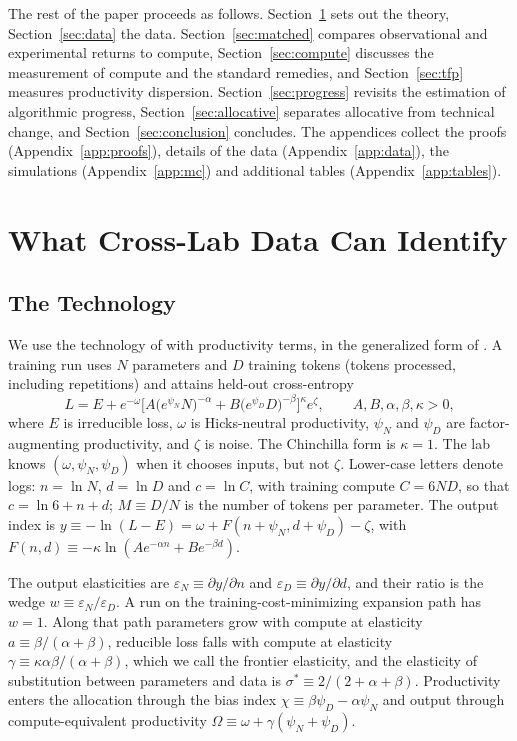 \documentclass[AER,finalmode]{AEA}
\theoremstyle{definition}
\theoremstyle{remark}
\begin{document}
The rest of the paper proceeds as follows. Section~\ref{sec:theory} sets out the theory, Section~\ref{sec:data} the
data. Section~\ref{sec:matched} compares observational and experimental returns to compute, Section~\ref{sec:compute}
discusses the measurement of compute and the standard remedies, and Section~\ref{sec:tfp} measures productivity
dispersion. Section~\ref{sec:progress} revisits the estimation of algorithmic progress, Section~\ref{sec:allocative}
separates allocative from technical change, and Section~\ref{sec:conclusion} concludes. The
appendices collect the proofs (Appendix~\ref{app:proofs}), details of the data (Appendix~\ref{app:data}), the
simulations (Appendix~\ref{app:mc}) and additional tables (Appendix~\ref{app:tables}).

\section{What Cross-Lab Data Can Identify}\label{sec:theory}

\subsection{The Technology}\label{sec:tech}

We use the technology of \citet{hoffmann2022training} with productivity terms, in the generalized form of
\citet{okar2026what}. A training run uses $N$ parameters and $D$ training tokens (tokens processed, including
repetitions) and attains held-out cross-entropy
\begin{equation}\label{eq:tech}
L=E+e^{-\omega}\Big[A\big(e^{\psi_N}N\big)^{-\alpha}+B\big(e^{\psi_D}D\big)^{-\beta}\Big]^{\kappa}e^{\zeta},
\qquad A,B,\alpha,\beta,\kappa>0,
\end{equation}
where $E$ is irreducible loss, $\omega$ is Hicks-neutral productivity, $\psi_N$ and $\psi_D$ are factor-augmenting
productivity, and $\zeta$ is noise. The Chinchilla form is $\kappa=1$. The lab knows $(\omega,\psi_N,\psi_D)$ when it
chooses inputs, but not $\zeta$. Lower-case letters denote logs: $n=\ln N$, $d=\ln D$ and $c=\ln C$, with training
compute $C=6ND$, so that $c=\ln6+n+d$; $M\equiv D/N$ is the number of tokens per parameter. The output index is
$y\equiv-\ln(L-E)=\omega+F(n+\psi_N,d+\psi_D)-\zeta$, with $F(n,d)\equiv-\kappa\ln(Ae^{-\alpha n}+Be^{-\beta d})$.

The output elasticities are $\varepsilon_N\equiv\partial y/\partial n$ and $\varepsilon_D\equiv\partial y/\partial d$,
and their ratio is the wedge $w\equiv\varepsilon_N/\varepsilon_D$. A run on the training-cost-minimizing expansion
path has $w=1$. Along that path parameters grow with compute at elasticity $a\equiv\beta/(\alpha+\beta)$, reducible
loss falls with compute at elasticity $\gamma\equiv\kappa\alpha\beta/(\alpha+\beta)$, which we call the frontier
elasticity, and the elasticity of substitution between parameters and data is $\sigma^*\equiv2/(2+\alpha+\beta)$.
Productivity enters the allocation through the bias index $\chi\equiv\beta\psi_D-\alpha\psi_N$ and output through
compute-equivalent productivity $\Omega\equiv\omega+\gamma(\psi_N+\psi_D)$.
\end{document}
